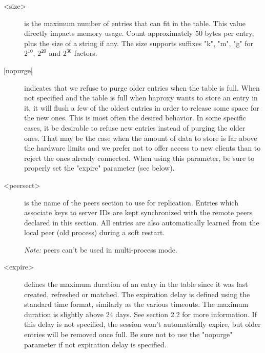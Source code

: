\begin{description}
  \item[<size>] is the maximum number of entries that can fit in the table. This
               value directly impacts memory usage. Count approximately
               50 bytes per entry, plus the size of a string if any. The size
               supports suffixes "k", "m", "g" for $2^{10}$, $2^{20}$ and $2^{30}$ factors.

  \item[{[nopurge]}] indicates that we refuse to purge older entries when the table
               is full. When not specified and the table is full when haproxy
               wants to store an entry in it, it will flush a few of the oldest
               entries in order to release some space for the new ones. This is
               most often the desired behavior. In some specific cases, it
               be desirable to refuse new entries instead of purging the older
               ones. That may be the case when the amount of data to store is
               far above the hardware limits and we prefer not to offer access
               to new clients than to reject the ones already connected. When
               using this parameter, be sure to properly set the "expire"
               parameter (see below).

  \item[<peersect>] is the name of the peers section to use for replication. Entries
               which associate keys to server IDs are kept synchronized with
               the remote peers declared in this section. All entries are also
               automatically learned from the local peer (old process) during a
               soft restart.

               \emph{Note:} peers can't be used in multi-process mode.

  \item[<expire>] defines the maximum duration of an entry in the table since it
               was last created, refreshed or matched. The expiration delay is
               defined using the standard time format, similarly as the various
               timeouts. The maximum duration is slightly above 24 days. See
               section 2.2 for more information. If this delay is not specified,
               the session won't automatically expire, but older entries will
               be removed once full. Be sure not to use the "nopurge" parameter
               if not expiration delay is specified.


\end{description}
